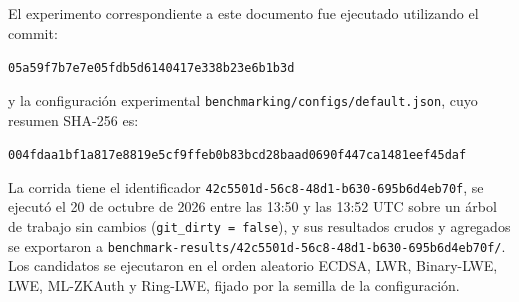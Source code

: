 El experimento correspondiente a este documento fue ejecutado utilizando el commit:

\begin{center}
    \texttt{05a59f7b7e7e05fdb5d6140417e338b23e6b1b3d}
\end{center}

y la configuración experimental \texttt{benchmarking/configs/default.json}, cuyo resumen SHA-256 es:

\begin{center}
    \texttt{004fdaa1bf1a817e8819e5cf9ffeb0b83bcd28baad0690f447ca1481eef45daf}
\end{center}

La corrida tiene el identificador \texttt{42c5501d-56c8-48d1-b630-695b6d4eb70f}, se ejecutó el 20 de octubre de 2026 entre las 13:50 y las 13:52 UTC sobre un árbol de trabajo sin cambios (\texttt{git\_dirty = false}), y sus resultados crudos y agregados se exportaron a \texttt{benchmark-results/42c5501d-56c8-48d1-b630-695b6d4eb70f/}. Los candidatos se ejecutaron en el orden aleatorio ECDSA, LWR, Binary-LWE, LWE, ML-ZKAuth y Ring-LWE, fijado por la semilla de la configuración.

